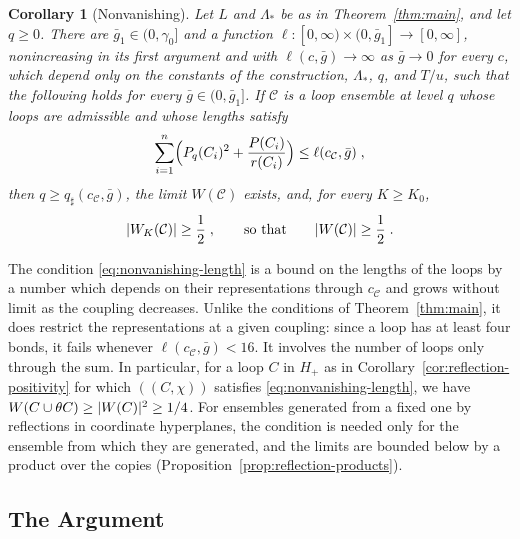 \documentclass[11pt]{preprint}
\DeclarePairedDelimiter{\abs}{\lvert}{\rvert}
\numberwithin{equation}{section}
\newtheorem{corollary}[theorem]{Corollary}
\theoremstyle{definition}
\theoremstyle{remark}
\theoremstyle{plain}
\begin{document}
\begin{corollary}[Nonvanishing]\label{cor:nonvanishing}
Let $L$ and $\Lambda_*$ be as in Theorem~\ref{thm:main}, and let $q \geq 0$. There are $\bar g_1 \in (0, \gamma_0]$ and a function $\ell \colon [0, \infty) \times (0, \bar g_1] \to [0, \infty]$, nonincreasing in its first argument and with $\ell(c, \bar g) \to \infty$ as $\bar g \to 0$ for every $c$, which depend only on the constants of the construction, $\Lambda_*$, $q$, and $T/u$, such that the following holds for every $\bar g \in (0, \bar g_1]$. If $\mathcal C$ is a loop ensemble at level $q$ whose loops are admissible and whose lengths satisfy
\begin{equation}\label{eq:nonvanishing-length}
    \sum_{i=1}^{n}\Bigl(P_q(C_i)^2 + \frac{P(C_i)}{r(C_i)}\Bigr) \leq \ell(c_{\mathcal C}, \bar g)\;,
\end{equation}
then $q \geq q_\sharp(c_{\mathcal C}, \bar g)$, the limit $W(\mathcal C)$ exists, and, for every $K \geq K_0$,
\begin{equation}\label{eq:nonvanishing-bound}
    \abs{W_K(\mathcal C)} \geq \frac12\;,
    \qquad\text{so that}\qquad
    \abs{W(\mathcal C)} \geq \frac12\;.
\end{equation}
\end{corollary}

The condition \eqref{eq:nonvanishing-length} is a bound on the lengths of the loops by a number which depends on their representations through $c_{\mathcal C}$ and grows without limit as the coupling decreases. Unlike the conditions of Theorem~\ref{thm:main}, it does restrict the representations at a given coupling: since a loop has at least four bonds, it fails whenever $\ell(c_{\mathcal C}, \bar g) < 16$. It involves the number of loops only through the sum. In particular, for a loop $C$ in $H_+$ as in Corollary~\ref{cor:reflection-positivity} for which $((C, \chi))$ satisfies \eqref{eq:nonvanishing-length}, we have $W(C \cup \theta C) \geq \abs{W(C)}^2 \geq 1/4$. For ensembles generated from a fixed one by reflections in coordinate hyperplanes, the condition is needed only for the ensemble from which they are generated, and the limits are bounded below by a product over the copies (Proposition~\ref{prop:reflection-products}).

\subsection{The Argument}\label{sec:argument}
\end{document}
